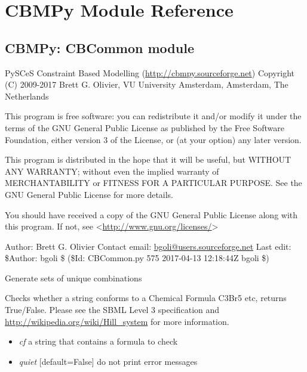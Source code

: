 \documentclass[a4paper,11pt,english]{sphinxmanual}
\begin{document}
\chapter{CBMPy Module Reference}
\label{modules_doc:cbmpy-module-reference}\label{modules_doc:module-cbmpy.CBCommon}\label{modules_doc::doc}

\section{CBMPy: CBCommon module}
\label{modules_doc:cbmpy-cbcommon-module}
PySCeS Constraint Based Modelling (\url{http://cbmpy.sourceforge.net})
Copyright (C) 2009-2017 Brett G. Olivier, VU University Amsterdam, Amsterdam, The Netherlands

This program is free software: you can redistribute it and/or modify
it under the terms of the GNU General Public License as published by
the Free Software Foundation, either version 3 of the License, or
(at your option) any later version.

This program is distributed in the hope that it will be useful,
but WITHOUT ANY WARRANTY; without even the implied warranty of
MERCHANTABILITY or FITNESS FOR A PARTICULAR PURPOSE.  See the
GNU General Public License for more details.

You should have received a copy of the GNU General Public License
along with this program.  If not, see \textless{}\url{http://www.gnu.org/licenses/}\textgreater{}

Author: Brett G. Olivier
Contact email: \href{mailto:bgoli@users.sourceforge.net}{bgoli@users.sourceforge.net}
Last edit: \$Author: bgoli \$ (\$Id: CBCommon.py 575 2017-04-13 12:18:44Z bgoli \$)

\begin{fulllineitems}
\label{modules_doc:cbmpy.CBCommon.ComboGen}
Generate sets of unique combinations

\end{fulllineitems}


\begin{fulllineitems}
\label{modules_doc:cbmpy.CBCommon.checkChemFormula}
Checks whether a string conforms to a Chemical Formula C3Br5 etc, returns True/False. Please see the SBML
Level 3 specification and \url{http://wikipedia.org/wiki/Hill\_system} for more information.
\begin{itemize}
\item {} 
\emph{cf} a string that contains a formula to check

\item {} 
\emph{quiet} {[}default=False{]} do not print error messages

\end{itemize}

\end{fulllineitems}
\end{document}
